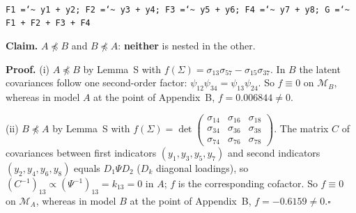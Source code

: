 \documentclass[10pt,a4paper]{article}
\newcommand{\nnest}{\not\preceq}
\begin{document}
\begin{minipage}[t]{0.49\textwidth}
\\[1pt]{\scriptsize \texttt{F1 =\char`\~{} y1 + y2; F2 =\char`\~{} y3 + y4; F3 =\char`\~{} y5 + y6; F4 =\char`\~{} y7 + y8; G =\char`\~{} F1 + F2 + F3 + F4}}\end{minipage}
\par\bigskip
\noindent\textbf{Claim.} $A \nnest B$ and $B \nnest A$: \textbf{neither} is nested in the other.\par\smallskip
\noindent\textbf{Proof.} (i) $A\nnest B$ by Lemma~S with $f(\Sigma)=\sigma_{13}\sigma_{57} - \sigma_{15}\sigma_{37}$. In $B$ the latent covariances follow one second-order factor: $\psi_{12}\psi_{34}=\psi_{13}\psi_{24}$. So $f\equiv0$ on $\mathcal M_B$, whereas in model $A$ at the point of Appendix~B, $f=0.006844\neq0$.\par\smallskip
\noindent(ii) $B\nnest A$ by Lemma~S with $f(\Sigma)=\det\!\begin{pmatrix}\sigma_{14} & \sigma_{16} & \sigma_{18} \\ \sigma_{34} & \sigma_{36} & \sigma_{38} \\ \sigma_{74} & \sigma_{76} & \sigma_{78}\end{pmatrix}$. The matrix $C$ of covariances between first indicators $(y_1,y_3,y_5,y_7)$ and second indicators $(y_2,y_4,y_6,y_8)$ equals $D_1\Psi D_2$ ($D_k$ diagonal loadings), so $(C^{-1})_{13}\propto(\Psi^{-1})_{13}=k_{13}=0$ in $A$; $f$ is the corresponding cofactor. So $f\equiv0$ on $\mathcal M_A$, whereas in model $B$ at the point of Appendix~B, $f=-0.6159\neq0$.\hfill$\square$\par\medskip
{}

\clearpage
\end{document}
